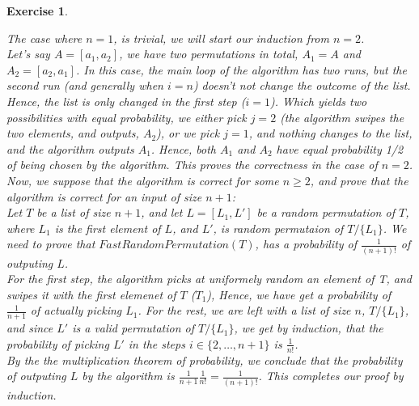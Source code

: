 \documentclass{article}
\newtheorem{exo}{Exercise}
\begin{document}
\begin{exo}{\ \\}

The case where $n=1$, is trivial, we will start our induction from $n=2$. \\


Let's say $A = [a_1, a_2]$, we have two permutations in total, $A_1 = A$ and $A_2 = [a_2, a_1]$. In this case, the main loop of the algorithm has two runs, but the second run (and generally when $i=n$) doesn't not change the outcome of the list. Hence, the list is only changed in the first step ($i = 1$). Which yields two possibilities with equal probability, we either pick $j=2$ (the algorithm swipes the two elements, and outputs, $A_2$), or we pick $j=1$, and nothing changes to the list, and the algorithm outputs $A_1$. Hence, both $A_1$ and $A_2$ have equal probability 1/2 of being chosen by the algorithm. This proves the correctness in the case of $n=2$.\\


Now, we suppose that the algorithm is correct for some $n \geq 2$, and prove that the algorithm is correct for an input of size $n+1$: \\

Let $T$ be a list of size $n+1$, and let $L =  [L_1,L']$ be a random permutation of $T$, where $L_1$ is the first element of $L$, and $L'$, is random permutaion of $T/\{L_1\}$. We need to prove that $FastRandomPermutation(T)$, has a probability of $\frac{1}{(n+1)!}$ of outputing $L$.  \\

For the first step, the algorithm picks at uniformely random an element of T, and swipes it with the first elemenet of $T$ ($T_1$), Hence, we have get a probability of $\frac{1}{n+1}$  of actually picking $L_1$. For the rest, we are left with a list of size $n$, $T/\{L_1\}$, and since $L'$ is a valid permutation of $T/\{L_1\}$, we get by induction, that the probability of picking $L'$ in the steps $i \in \{2,\dots , n+1\}$ is $\frac{1}{n!}$. \\

By the the multiplication theorem of probability, we conclude that the probability of outputing $L$ by the algorithm is $\frac{1}{n+1} \frac{1}{n!} = \frac{1}{(n+1)!}$. This completes our proof by induction.
 
\end{exo}
\end{document}
